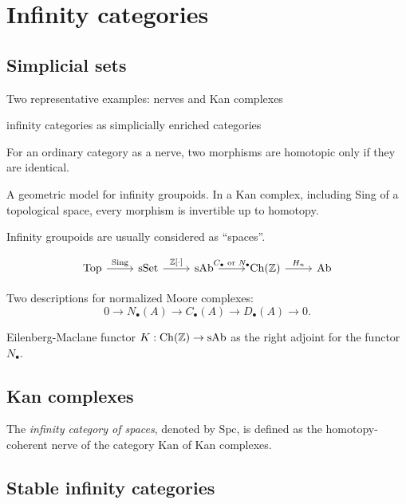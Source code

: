 \documentclass{../../large}
\begin{document}
\chapter{Infinity categories}
\section{Simplicial sets}

Two representative examples: nerves and Kan complexes

infinity categories as simplicially enriched categories

\begin{prb}[Nerves]
For an ordinary category as a nerve, two morphisms are homotopic only if they are identical.
\end{prb}

\begin{prb}
A geometric model for infinity groupoids.
In a Kan complex, including Sing of a topological space, every morphism is invertible up to homotopy.

Infinity groupoids are usually considered as ``spaces''.
\end{prb}

\begin{prb}
\[\begin{tikzcd}
\mathrm{Top} \rar{\mathrm{Sing}} &
\mathrm{sSet} \rar{\Z[\cdot]} &
\mathrm{sAb} \rar{C_\bullet\text{ or }N_\bullet} &
\mathrm{Ch}(\Z) \rar{H_n} &
\mathrm{Ab}
\end{tikzcd}\]

Two descriptions for normalized Moore complexes:
\[0\to N_\bullet(A)\to C_\bullet(A)\to D_\bullet(A)\to0.\]

Eilenberg-Maclane functor $K:\mathrm{Ch}(\mathbb{Z})\to\mathrm{sAb}$ as the right adjoint for the functor $N_\bullet$.
\end{prb}





\section{Kan complexes}

The \emph{infinity category of spaces}, denoted by $\mathrm{Spc}$, is defined as the homotopy-coherent nerve of the category $\mathrm{Kan}$ of Kan complexes.

\section{Stable infinity categories}
\end{document}
